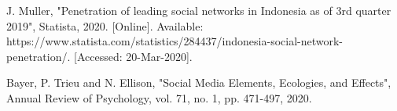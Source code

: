 \begin{thebibliography}{30}

{J. Muller, "Penetration of leading social networks in Indonesia as of 3rd quarter 2019", Statista, 2020. [Online]. Available: https://www.statista.com/statistics/284437/indonesia-social-network-penetration/. [Accessed: 20-Mar-2020].}

{Bayer, P. Trieu and N. Ellison, "Social Media Elements, Ecologies, and Effects", Annual Review of Psychology, vol. 71, no. 1, pp. 471-497, 2020.}

\end{thebibliography}